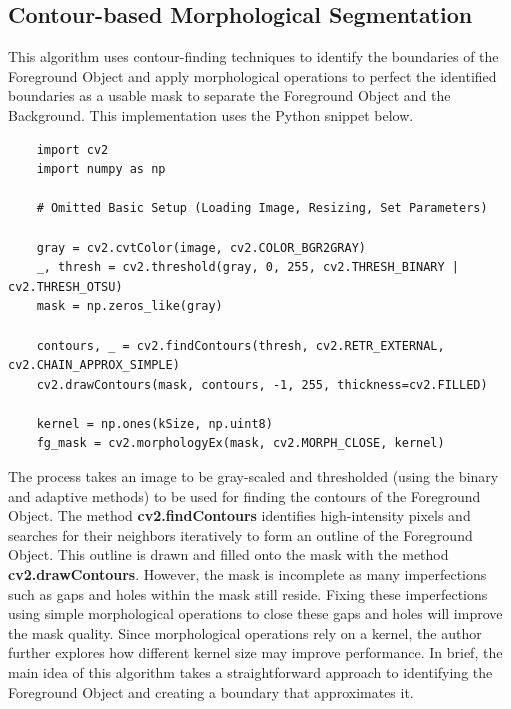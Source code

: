 \documentclass{article}
\begin{document}
\subsection{Contour-based Morphological Segmentation}

\renewcommand{\theFancyVerbLine}{
  \sffamily\textcolor[rgb]{0.5,0.5,0.5}{\scriptsize\arabic{FancyVerbLine}}}

This algorithm uses contour-finding techniques to identify the boundaries of the Foreground Object and apply morphological operations to perfect the identified boundaries as a usable mask to separate the Foreground Object and the Background. This implementation uses the Python snippet below.

\begin{verbatim}
    import cv2
    import numpy as np

    # Omitted Basic Setup (Loading Image, Resizing, Set Parameters)

    gray = cv2.cvtColor(image, cv2.COLOR_BGR2GRAY)
    _, thresh = cv2.threshold(gray, 0, 255, cv2.THRESH_BINARY | cv2.THRESH_OTSU)
    mask = np.zeros_like(gray)

    contours, _ = cv2.findContours(thresh, cv2.RETR_EXTERNAL, cv2.CHAIN_APPROX_SIMPLE)
    cv2.drawContours(mask, contours, -1, 255, thickness=cv2.FILLED)

    kernel = np.ones(kSize, np.uint8)
    fg_mask = cv2.morphologyEx(mask, cv2.MORPH_CLOSE, kernel)
\end{verbatim}

The process takes an image to be gray-scaled and thresholded (using the binary and adaptive methods) to be used for finding the contours of the Foreground Object. The method \textbf{cv2.findContours} identifies high-intensity pixels and searches for their neighbors iteratively to form an outline of the Foreground Object. This outline is drawn and filled onto the mask with the method \textbf{cv2.drawContours}. However, the mask is incomplete as many imperfections such as gaps and holes within the mask still reside. Fixing these imperfections using simple morphological operations to close these gaps and holes will improve the mask quality. Since morphological operations rely on a kernel, the author further explores how different kernel size may improve performance. In brief, the main idea of this algorithm takes a straightforward approach to identifying the Foreground Object and creating a boundary that approximates it.
\end{document}
